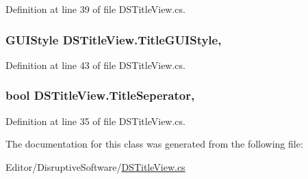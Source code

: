 Definition at line 39 of file D\+S\+Title\+View.\+cs.

\hypertarget{class_d_s_title_view_a77311fd48c0f267cfecf55552c460f80}{
\subsubsection[{Title\+G\+U\+I\+Style}]{\setlength{\rightskip}{0pt plus 5cm}G\+U\+I\+Style D\+S\+Title\+View.\+Title\+G\+U\+I\+Style\hspace{0.3cm}{\ttfamily [get]}, {\ttfamily [set]}}}\label{class_d_s_title_view_a77311fd48c0f267cfecf55552c460f80}


Definition at line 43 of file D\+S\+Title\+View.\+cs.

\hypertarget{class_d_s_title_view_a6fcf5594ac0a89cf0b9ffc15cba759df}{
\subsubsection[{Title\+Seperator}]{\setlength{\rightskip}{0pt plus 5cm}bool D\+S\+Title\+View.\+Title\+Seperator\hspace{0.3cm}{\ttfamily [get]}, {\ttfamily [set]}}}\label{class_d_s_title_view_a6fcf5594ac0a89cf0b9ffc15cba759df}


Definition at line 35 of file D\+S\+Title\+View.\+cs.



The documentation for this class was generated from the following file\+:\begin{DoxyCompactItemize}
\item 
Editor/\+Disruptive\+Software/\hyperlink{_d_s_title_view_8cs}{D\+S\+Title\+View.\+cs}\end{DoxyCompactItemize}
